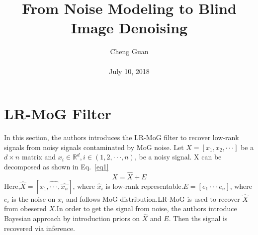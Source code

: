 \documentclass[10pt,twocolumn,letterpaper]{article}
\title{From Noise Modeling to Blind Image Denoising}
\author{Cheng Guan\\\\
July 10, 2018}
\begin{document}
\maketitle
\section{LR-MoG Filter}
In this section, the authors introduces the LR-MoG filter to
recover low-rank signals from noisy signals contaminated by
MoG noise. Let $X=\left[x_1,x_2,\cdot\cdot\cdot\right]$ be a
$d\times n$ matrix and $x_i \in \mathbb{R}^d,i\in \left(1,2,\cdot\cdot\cdot,n\right)$, be a noisy signal. X can be
decomposed as shown in Eq.~\ref{eq1}
\begin{equation}
 X = \hat{X} + E
\label{eq1}
\end{equation}
Here,$\hat{X}=\left[\hat{x_1,\cdot\cdot\cdot,\hat{x_n}}\right]$, 
where $\hat{x}_i$ is low-rank representable.$E=\left[e_1\cdot\cdot\cdot e_n\right]$, 
where $e_i$ is the noise on $x_i$ and follows MoG distribution.LR-MoG is 
used to recover $\hat{X}$ from obesered $X$.In order to get the signal 
from noise, the authors introduce Bayesian approach by introduction 
priors on $\hat{X}$ and $E$. Then ths signal is recovered via inference.
\end{document}
